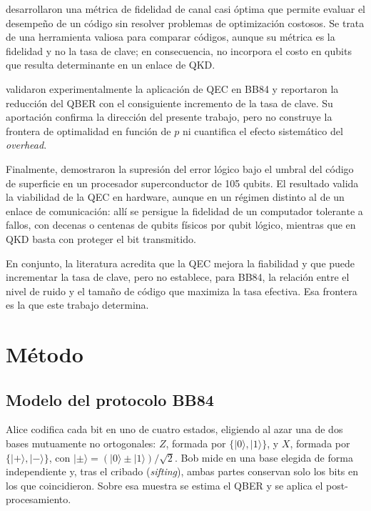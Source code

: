 \documentclass[conference]{IEEEtran}
\begin{document}
\cite{zheng2024} desarrollaron una métrica de fidelidad de canal casi óptima que
permite evaluar el desempeño de un código sin resolver problemas de optimización
costosos. Se trata de una herramienta valiosa para comparar códigos, aunque su
métrica es la fidelidad y no la tasa de clave; en consecuencia, no incorpora el
costo en qubits que resulta determinante en un enlace de QKD.

\cite{jayachandran2025} validaron experimentalmente la aplicación de QEC en BB84
y reportaron la reducción del QBER con el consiguiente incremento de la tasa de
clave. Su aportación confirma la dirección del presente trabajo, pero no
construye la frontera de optimalidad en función de $p$ ni cuantifica el efecto
sistemático del \textit{overhead}.

Finalmente, \cite{acharya2025} demostraron la supresión del error lógico bajo el
umbral del código de superficie en un procesador superconductor de 105 qubits.
El resultado valida la viabilidad de la QEC en hardware, aunque en un régimen
distinto al de un enlace de comunicación: allí se persigue la fidelidad de un
computador tolerante a fallos, con decenas o centenas de qubits físicos por qubit
lógico, mientras que en QKD basta con proteger el bit transmitido.

En conjunto, la literatura acredita que la QEC mejora la fiabilidad y que puede
incrementar la tasa de clave, pero no establece, para BB84, la relación entre el
nivel de ruido y el tamaño de código que maximiza la tasa efectiva. Esa frontera
es la que este trabajo determina.

\section{Método}
\label{sec:metodo}

\subsection{Modelo del protocolo BB84}

Alice codifica cada bit en uno de cuatro estados, eligiendo al azar una de dos
bases mutuamente no ortogonales: $Z$, formada por $\{|0\rangle,|1\rangle\}$, y
$X$, formada por $\{|+\rangle,|-\rangle\}$, con
$|\pm\rangle=(|0\rangle\pm|1\rangle)/\sqrt{2}$. Bob mide en una base elegida de
forma independiente y, tras el cribado (\textit{sifting}), ambas partes
conservan solo los bits en los que coincidieron. Sobre esa muestra se estima el
QBER y se aplica el post-procesamiento.
\end{document}
